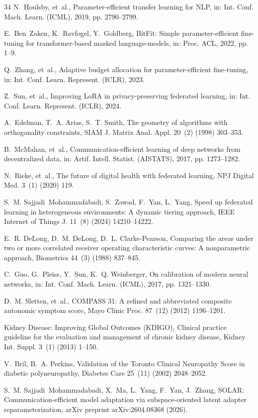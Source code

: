 \documentclass[a4paper,fleqn]{cas-dc}
\begin{document}
\begin{thebibliography}{34}
N.~Houlsby, et~al., Parameter-efficient transfer learning for NLP, in: Int. Conf. Mach. Learn. (ICML), 2019, pp. 2790--2799.

E.~Ben~Zaken, K.~Ravfogel, Y.~Goldberg, BitFit: Simple parameter-efficient fine-tuning for transformer-based masked language-models, in: Proc. ACL, 2022, pp. 1--9.

Q.~Zhang, et~al., Adaptive budget allocation for parameter-efficient fine-tuning, in: Int. Conf. Learn. Represent. (ICLR), 2023.

Z.~Sun, et~al., Improving LoRA in privacy-preserving federated learning, in: Int. Conf. Learn. Represent. (ICLR), 2024.

A.~Edelman, T.~A. Arias, S.~T. Smith, The geometry of algorithms with orthogonality constraints, SIAM J. Matrix Anal. Appl. 20~(2) (1998) 303--353.

B.~McMahan, et~al., Communication-efficient learning of deep networks from decentralized data, in: Artif. Intell. Statist. (AISTATS), 2017, pp. 1273--1282.

N.~Rieke, et~al., The future of digital health with federated learning, NPJ Digital Med. 3~(1) (2020) 119.

S.~M. Sajjadi~Mohammadabadi, S.~Zawad, F.~Yan, L.~Yang, Speed up federated learning in heterogeneous environments: A dynamic tiering approach, IEEE Internet of Things J. 11~(8) (2024) 14210--14222.

E.~R. DeLong, D.~M. DeLong, D.~L. Clarke-Pearson, Comparing the areas under two or more correlated receiver operating characteristic curves: A nonparametric approach, Biometrics 44~(3) (1988) 837--845.

C.~Guo, G.~Pleiss, Y.~Sun, K.~Q. Weinberger, On calibration of modern neural networks, in: Int. Conf. Mach. Learn. (ICML), 2017, pp. 1321--1330.

D.~M. Sletten, et~al., COMPASS 31: A refined and abbreviated composite autonomic symptom score, Mayo Clinic Proc. 87~(12) (2012) 1196--1201.

Kidney Disease: Improving Global Outcomes (KDIGO), Clinical practice guideline for the evaluation and management of chronic kidney disease, Kidney Int. Suppl. 3~(1) (2013) 1--150.

V.~Bril, B.~A. Perkins, Validation of the Toronto Clinical Neuropathy Score in diabetic polyneuropathy, Diabetes Care 25~(11) (2002) 2048--2052.

S.~M. Sajjadi~Mohammadabadi, X.~Ma, L.~Yang, F.~Yan, J.~Zhang, SOLAR: Communication-efficient model adaptation via subspace-oriented latent adapter reparameterization, arXiv preprint arXiv:2604.08368 (2026).

\end{thebibliography}
\end{document}
